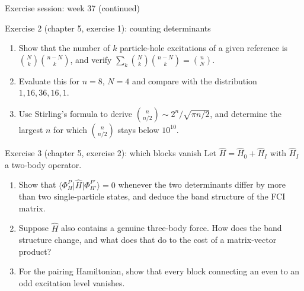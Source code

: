 \documentclass[aspectratio=169,10pt]{beamer}
\newcommand{\ket}[1]{\vert #1\rangle}
\newcommand{\bra}[1]{\langle #1\vert}
\begin{document}
\begin{frame}{Exercise session: week 37 (continued)}
  \footnotesize
  \begin{block}{Exercise 2 (chapter 5, exercise 1): counting determinants}
    \begin{enumerate}
      \item[a)] Show that the number of $k$ particle-hole excitations of a given reference is $\binom{N}{k}\binom{n-N}{k}$, and verify $\sum_k\binom{N}{k}\binom{n-N}{k}=\binom{n}{N}$.
      \item[b)] Evaluate this for $n=8$, $N=4$ and compare with the distribution $1,16,36,16,1$.
      \item[c)] Use Stirling's formula to derive $\binom{n}{n/2}\sim2^n/\sqrt{\pi n/2}$, and determine the largest $n$ for which $\binom{n}{n/2}$ stays below $10^{10}$.
    \end{enumerate}
  \end{block}
  \begin{block}{Exercise 3 (chapter 5, exercise 2): which blocks vanish}
    Let $\hat{H}=\hat{H}_0+\hat{H}_I$ with $\hat{H}_I$ a two-body operator.
    \begin{enumerate}
      \item[a)] Show that $\bra{\Phi_H^P}\hat{H}\ket{\Phi_{H'}^{P'}}=0$ whenever the two determinants differ by more than two single-particle states, and deduce the band structure of the FCI matrix.
      \item[b)] Suppose $\hat{H}$ also contains a genuine three-body force. How does the band structure change, and what does that do to the cost of a matrix-vector product?
      \item[c)] For the pairing Hamiltonian, show that every block connecting an even to an odd excitation level vanishes.
    \end{enumerate}
  \end{block}
\end{frame}
\end{document}
